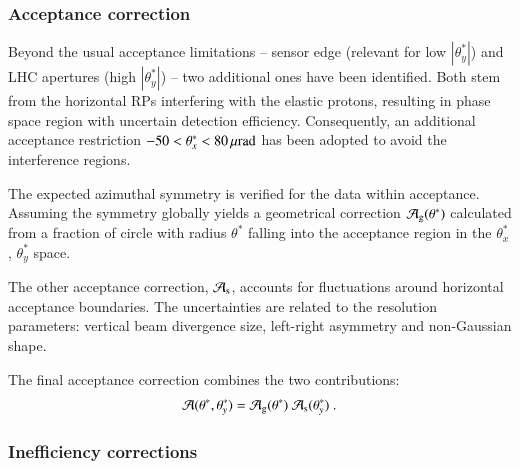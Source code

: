 


\subsubsection{Acceptance correction}

Beyond the usual acceptance limitations -- sensor edge (relevant for low $|\theta^*_y|$) and LHC apertures (high $|\theta_y^*|$) -- two additional ones have been identified. Both stem from the horizontal RPs interfering with the elastic protons, resulting in phase space region with uncertain detection efficiency. Consequently, an additional acceptance restriction $-50 < \theta_x^* < 80\,{\rm \mu rad}$ has been adopted to avoid the interference regions.

The expected azimuthal symmetry is verified for the data within acceptance. Assuming the symmetry globally yields a geometrical correction ${\cal A}_{\rm g}(\theta^*)$ calculated from a fraction of circle with radius $\theta^*$ falling into the acceptance region in the $\theta_x^*$, $\theta_y^*$ space.

The other acceptance correction, ${\cal A}_{\rm s}$, accounts for fluctuations around horizontal acceptance boundaries.  The uncertainties are related to the resolution parameters: vertical beam divergence size, left-right asymmetry and non-Gaussian shape.

The final acceptance correction combines the two contributions:
\begin{equation}
{\cal A}(\theta^*, \theta_y^*) = {\cal A}_{\rm g}(\theta^*)\ {\cal A}_{\rm s}(\theta_y^*)\ .
\end{equation}

\subsubsection{Inefficiency corrections}

